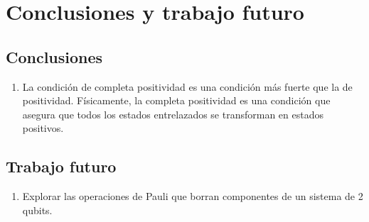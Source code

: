 \chapter{Conclusiones y trabajo futuro}
\section{Conclusiones}
\begin{enumerate}
\item La condición de completa positividad es una condición 
más fuerte que la de positividad. Físicamente, la completa
positividad es una condición que asegura que todos 
los estados entrelazados se transforman en estados positivos.
\end{enumerate}

\section{Trabajo futuro}
\begin{enumerate}
\item Explorar las operaciones de Pauli que borran componentes
de un sistema de 2 qubits.
\end{enumerate}